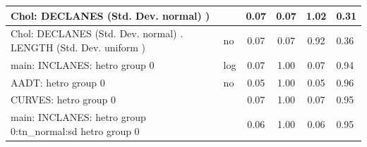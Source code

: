 \begin{table}
\begin{center}
\begin{tabular}{|l|l|c|c|c|l|}
			\hline
			 Chol: DECLANES (Std. Dev. normal) ) &  & 0.07 & 0.07 & 1.02 & 0.31 \\
			\hline
			 Chol: DECLANES (Std. Dev. normal) . LENGTH (Std. Dev.   uniform ) & no & 0.07 & 0.07 & 0.92 & 0.36 \\
			\hline
			main: INCLANES: hetro group 0 & log & 0.07 & 1.00 & 0.07 & 0.94 \\
			\hline
			AADT: hetro group 0 & no & 0.05 & 1.00 & 0.05 & 0.96 \\
			\hline
			CURVES: hetro group 0 &  & 0.07 & 1.00 & 0.07 & 0.95 \\
			\hline
			main: INCLANES: hetro group 0:tn_normal:sd  hetro group 0 &  & 0.06 & 1.00 & 0.06 & 0.95 \\
			\hline
		\end{tabular}
	\end{center}
\end{table}